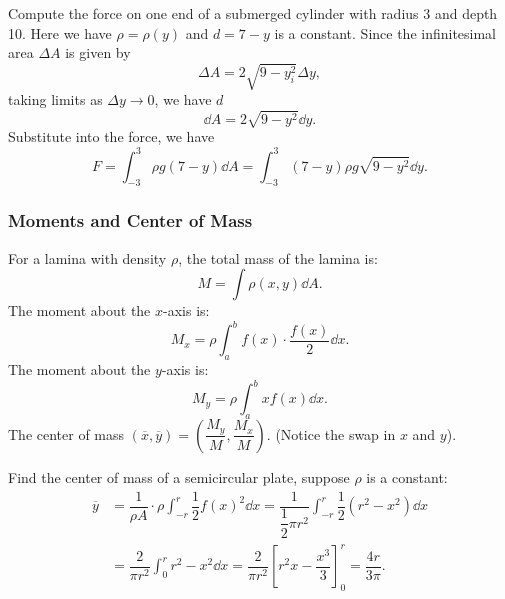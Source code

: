 \begin{ex} Compute the force on one end of a submerged cylinder with radius 3 and depth 10.
    Here we have $\rho = \rho(y)$ and $d = 7-y$ is a constant. Since the infinitesimal area $\Delta A$ is given by 
    \[\Delta A = 2 \sqrt{9-y_i^2} \Delta y,\]
    taking limits as $\Delta y \to 0$, we have $d$
    \[\dd A = 2 \sqrt{9-y^2} \dd y. \]
    Substitute into the force, we have
    \[F = \int_{-3}^3 \rho g (7-y)  \dd A = \int_{-3}^3 (7-y) \rho g \sqrt{9-y^2} \dd y.\]
\end{ex}


\subsubsection{Moments and Center of Mass}
For a lamina with density $\rho$, the total mass of the lamina is:
\[M = \int \rho(x, y) \dd A.\]
The moment about the $x$-axis is:
\[M_x = \rho \int_a^b f(x) \cdot \dfrac{f(x)}{2} \dd x.\]
The moment about the $y$-axis is:
\[M_y = \rho \int_a^b x f(x) \dd x.\]
The center of mass $(\overline{x}, \overline{y}) = (\dfrac{M_y}{M}, \dfrac{M_x}{M})$. (Notice the swap in $x$ and $y$).

\begin{ex}
    Find the center of mass of a semicircular plate, suppose $\rho$ is a constant:
    \begin{align*}
        \overline{y} &= \dfrac{1}{\rho A} \cdot \rho \int_{-r}^r \dfrac{1}{2} f(x)^2 \dd x = \dfrac{1}{\dfrac{1}{2}\pi r^2} \int_{-r}^r \dfrac{1}{2} (r^2 - x^2) \dd x \tag{Use symmetry}\\
        &= \dfrac{2}{\pi r^2} \int_{0}^r r^2 - x^2 \dd x = \dfrac{2}{\pi r^2} \left[ r^2 x - \dfrac{x^3}{3} \right]_0^r = \dfrac{4r}{3\pi}.
    \end{align*}
\end{ex}
